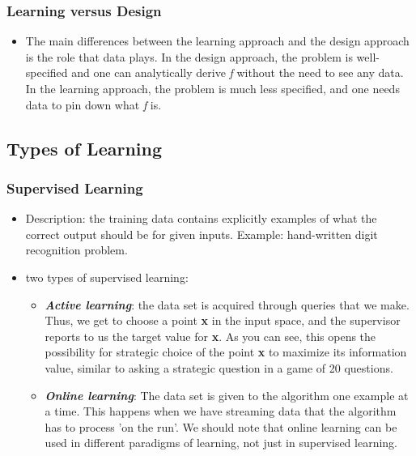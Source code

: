\documentclass[11pt]{article}
\theoremstyle{definition}
\numberwithin{equation}{section}
\begin{document}
\subsubsection{Learning versus Design}
\begin{itemize}[noitemsep, topsep=0pt]
    \item The main differences between the learning approach and the design approach is the role that data plays. In the design approach, the problem is well-specified and one can analytically derive \textit{f} without the need to see any data. In the learning approach, the problem is much less specified, and one needs data to pin down what \textit{f} is.
\end{itemize}

\subsection{Types of Learning}
\subsubsection{Supervised Learning}
\begin{itemize}[noitemsep, topsep=0pt]
    \item Description: the training data contains explicitly examples of what the correct output should be for given inputs. Example: hand-written digit recognition problem.
    \item two types of supervised learning:
    \begin{itemize}[noitemsep, topsep=0pt]
        \item \textbf{\textit{Active learning}}: the data set is acquired through queries that we make. Thus, we get to choose a point \textbf{x} in the input space, and the supervisor reports to us the target value for \textbf{x}. As you can see, this opens the possibility for strategic choice of the point \textbf{x} to maximize its information value, similar to asking a strategic question in a game of 20 questions.
        \item \textbf{\textit{Online learning}}: The data set is given to the algorithm one example at a time. This happens when we have streaming data that the algorithm has to process 'on the run'. We should note that online learning can be used in different paradigms of learning, not just in supervised learning.
    \end{itemize}
\end{itemize}
\end{document}
